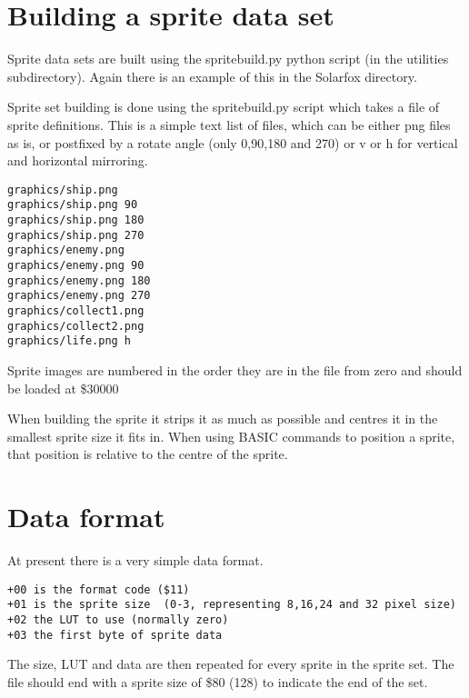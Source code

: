 \section{Building a sprite data set}
	
Sprite data sets are built using the spritebuild.py python script (in the utilities subdirectory). Again there is an example of this in the Solarfox directory.

Sprite set building is done using the spritebuild.py script which takes a file of sprite definitions. This is a simple text list of files, which can be either png files as is, or postfixed by a rotate angle (only 0,90,180 and 270) or v or h for vertical and horizontal mirroring.

\begin{verbatim}
graphics/ship.png
graphics/ship.png 90
graphics/ship.png 180
graphics/ship.png 270
graphics/enemy.png
graphics/enemy.png 90
graphics/enemy.png 180
graphics/enemy.png 270
graphics/collect1.png
graphics/collect2.png
graphics/life.png h
\end{verbatim}

Sprite images are numbered in the order they are in the file from zero and should be loaded at \$30000

When building the sprite it strips it as much as possible and centres it in the smallest sprite size it fits in. When using BASIC commands to position a sprite, that position is relative to the centre of the sprite.

\section{Data format}

At present there is a very simple data format. \

\begin{verbatim}
+00 is the format code ($11) 
+01 is the sprite size  (0-3, representing 8,16,24 and 32 pixel size) 
+02 the LUT to use (normally zero) 
+03 the first byte of sprite data 
\end{verbatim}

The size, LUT and data are then repeated for every sprite in the sprite set. The file should end with a sprite size of \$80 (128) to indicate the end of the set.


